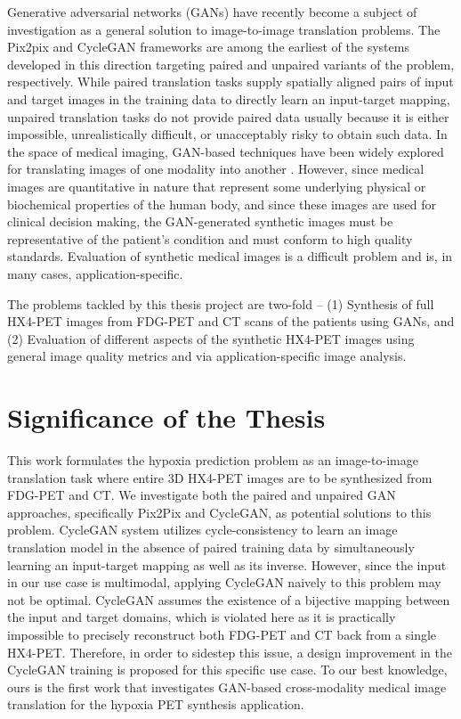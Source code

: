 Generative adversarial networks (GANs) have recently become a subject of investigation as a general solution to image-to-image translation problems. The Pix2pix and CycleGAN frameworks \cite{isola2017image, zhu2017unpaired} are among the earliest of the systems developed in this direction targeting paired and unpaired variants of the problem, respectively. While paired translation tasks supply spatially aligned pairs of input and target images in the training data to directly learn an input-target mapping, unpaired translation tasks do not provide paired data usually because it is either impossible, unrealistically difficult, or unacceptably risky to obtain such data. In the space of medical imaging, GAN-based techniques have been widely explored for translating images of one modality into another \cite{yi2019generative}. However, since medical images are quantitative in nature that represent some underlying physical or biochemical properties of the human body, and since these images are used for clinical decision making, the GAN-generated synthetic images must be representative of the patient's condition and must conform to high quality standards. Evaluation of synthetic medical images is a difficult problem and is, in many cases, application-specific. 

The problems tackled by this thesis project are two-fold -- (1) Synthesis of full HX4-PET images from FDG-PET and CT scans of the patients using GANs, and (2) Evaluation of different aspects of the synthetic HX4-PET images using general image quality metrics and via application-specific image analysis.



\section{Significance of the Thesis}
This work formulates the hypoxia prediction problem as an image-to-image translation task where entire 3D HX4-PET images are to be synthesized from FDG-PET and CT. We investigate both the paired and unpaired GAN approaches, specifically Pix2Pix and CycleGAN, as potential solutions to this problem. CycleGAN system utilizes cycle-consistency to learn an image translation model in the absence of paired training data by simultaneously learning an input-target mapping as well as its inverse. However, since the input in our use case is multimodal, applying CycleGAN naively to this problem may not be optimal. CycleGAN assumes the existence of a bijective mapping between the input and target domains, which is violated here as it is practically impossible to precisely reconstruct both FDG-PET and CT back from a single HX4-PET. Therefore, in order to sidestep this issue, a design improvement in the CycleGAN training is proposed for this specific use case. To our best knowledge, ours is the first work that investigates GAN-based cross-modality medical image translation for the hypoxia PET synthesis application.

